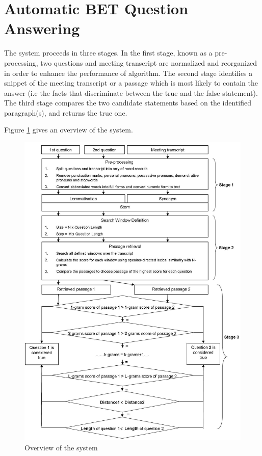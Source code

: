 \documentclass[10pt,a4paper]{article}
\author{Quoc Anh Le}
\numberwithin{algorithm}{section}  %
\begin{document}
\section{Automatic BET Question Answering}
%
%

The system proceeds in three stages. In the first stage, known as a pre-processing, two questions and meeting transcript are normalized and reorganized in order to enhance the performance of algorithm. The second stage identifies a snippet of the meeting transcript or a passage which is most likely to contain the answer (i.e the facts that discriminate between the true and the false statement). The third stage compares the two candidate statements based on the identified paragraph(s), and returns the true one. 

Figure \ref{stages_of_system} gives an overview of the system. 

\begin{figure}[htbp]
\label{stages_of_system}

\includegraphics[scale = 0.4]{Stages_of_system.jpg}
\caption{Overview of the system}
\end{figure}
\end{document}
